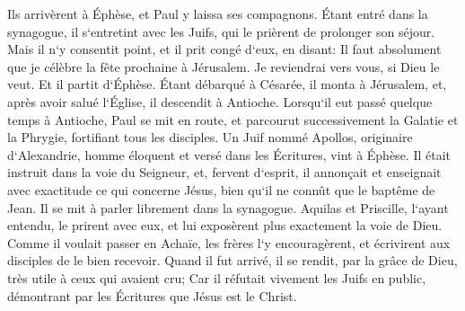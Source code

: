 \verse Ils arrivèrent à Éphèse, et Paul y laissa ses compagnons. Étant entré dans la synagogue, il s`entretint avec les Juifs, 
\verse qui le prièrent de prolonger son séjour. 
\verse Mais il n`y consentit point, et il prit congé d`eux, en disant: Il faut absolument que je célèbre la fête prochaine à Jérusalem. Je reviendrai vers vous, si Dieu le veut. Et il partit d`Éphèse. 
\verse Étant débarqué à Césarée, il monta à Jérusalem, et, après avoir salué l`Église, il descendit à Antioche. 
\verse Lorsqu`il eut passé quelque temps à Antioche, Paul se mit en route, et parcourut successivement la Galatie et la Phrygie, fortifiant tous les disciples. 
\verse Un Juif nommé Apollos, originaire d`Alexandrie, homme éloquent et versé dans les Écritures, vint à Éphèse. 
\verse Il était instruit dans la voie du Seigneur, et, fervent d`esprit, il annonçait et enseignait avec exactitude ce qui concerne Jésus, bien qu`il ne connût que le baptême de Jean. 
\verse Il se mit à parler librement dans la synagogue. Aquilas et Priscille, l`ayant entendu, le prirent avec eux, et lui exposèrent plus exactement la voie de Dieu. 
\verse Comme il voulait passer en Achaïe, les frères l`y encouragèrent, et écrivirent aux disciples de le bien recevoir. Quand il fut arrivé, il se rendit, par la grâce de Dieu, très utile à ceux qui avaient cru; 
\verse Car il réfutait vivement les Juifs en public, démontrant par les Écritures que Jésus est le Christ. 

